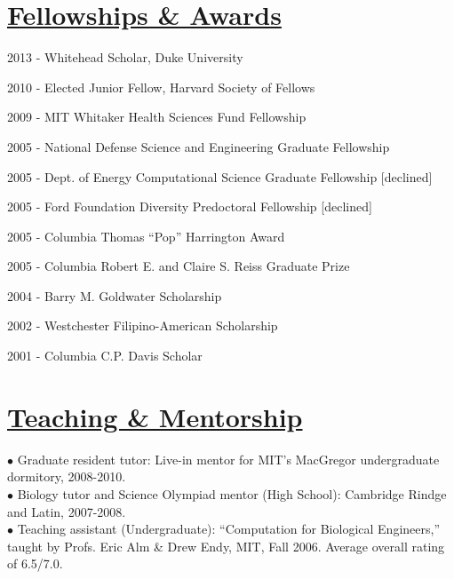 \documentclass[overlapped,line,11pt]{res}
\newenvironment{list1}{
  \begin{list}{\ding{113}}{%
      \setlength{\itemsep}{0in}
      \setlength{\parsep}{0in} \setlength{\parskip}{0in}
      \setlength{\topsep}{0in} \setlength{\partopsep}{0in} 
      \setlength{\leftmargin}{0.17in}}}{\end{list}}
\begin{document}
\begin{resume}
\section{\underline{\sc Fellowships \& Awards}} 
\vspace{.25in}
\begin{list1}
\item[] 2013 - Whitehead Scholar, Duke University%
\item[] 2010 - Elected Junior Fellow, Harvard Society of Fellows%
\item[] 2009 - MIT Whitaker Health Sciences Fund Fellowship %
\item[] 2005 - National Defense Science and Engineering Graduate
  Fellowship %
\item[] 2005 - Dept. of Energy Computational Science Graduate Fellowship
  [declined] %
\item[] 2005 - Ford Foundation Diversity Predoctoral Fellowship
  [declined] %
\item[] 2005 - Columbia Thomas ``Pop'' Harrington Award
\item[] 2005 - Columbia Robert E. and Claire S. Reiss Graduate Prize
\item[] 2004 - Barry M. Goldwater Scholarship
\item[] 2002 - Westchester Filipino-American Scholarship
\item[] 2001 - Columbia C.P. Davis Scholar
\end{list1}

\section{\underline{\sc Teaching \& Mentorship}}
\vspace{.05in}

\hangindent=0.5in $\bullet$\hspace{.1in} Graduate resident tutor:
Live-in mentor for MIT's MacGregor undergraduate dormitory, 2008-2010.  \\

\vspace{-10mm}
\hangindent=0.5in $\bullet$\hspace{.1in} Biology tutor and Science
Olympiad mentor (High School): Cambridge Rindge and Latin,
2007-2008. \\

\vspace{-10mm}
\hangindent=0.5in $\bullet$\hspace{.1in} Teaching assistant
(Undergraduate): ``Computation for Biological Engineers,''
taught by Profs. Eric Alm \& Drew Endy, MIT, Fall 2006.  Average overall rating
  of 6.5/7.0.


\end{resume}
\end{document}
